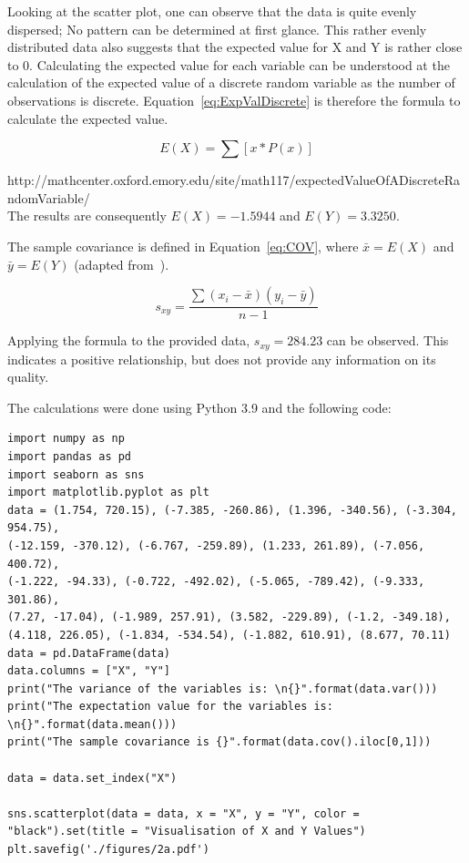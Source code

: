 Looking at the scatter plot, one can observe that the data is quite evenly dispersed; No pattern can be determined at first glance. This rather evenly distributed data also suggests that the expected value for X and Y is rather close to 0. Calculating the expected value for each variable can be understood at the calculation of the expected value of a discrete random variable as the number of observations is discrete. Equation~\ref{eq:ExpValDiscrete} is therefore the formula to calculate the expected value. 


\begin{equation}  E(X) = \sum [x * P(x)]
\label{eq:ExpValDiscrete}
\end{equation}

http://mathcenter.oxford.emory.edu/site/math117/expectedValueOfADiscreteRandomVariable/
\\

The results are consequently $E(X) = -1.5944$ and $E(Y) = 3.3250$.

The sample covariance is defined in Equation~\ref{eq:COV}, where $\bar{x} = E(X)$ and $\bar{y} = E(Y)$ (adapted from~\cite{bruce2017practical}).

\begin{equation}  s_{xy} = \frac{\sum(x_{i}-\bar{x})(y_{i}-\bar{y})}{n-1}
\label{eq:COV}
\end{equation}

Applying the formula to the provided data, $s_{xy} = 284.23$ can be observed. This indicates a positive relationship, but does not provide any information on its quality. 

The calculations were done using Python 3.9 and the following code:

\begin{lstlisting}
import numpy as np
import pandas as pd
import seaborn as sns
import matplotlib.pyplot as plt
data = (1.754, 720.15), (-7.385, -260.86), (1.396, -340.56), (-3.304, 954.75),
(-12.159, -370.12), (-6.767, -259.89), (1.233, 261.89), (-7.056, 400.72), 
(-1.222, -94.33), (-0.722, -492.02), (-5.065, -789.42), (-9.333, 301.86),
(7.27, -17.04), (-1.989, 257.91), (3.582, -229.89), (-1.2, -349.18), 
(4.118, 226.05), (-1.834, -534.54), (-1.882, 610.91), (8.677, 70.11)
data = pd.DataFrame(data)
data.columns = ["X", "Y"]
print("The variance of the variables is: \n{}".format(data.var()))
print("The expectation value for the variables is: \n{}".format(data.mean()))
print("The sample covariance is {}".format(data.cov().iloc[0,1]))

data = data.set_index("X")

sns.scatterplot(data = data, x = "X", y = "Y", color = "black").set(title = "Visualisation of X and Y Values")
plt.savefig('./figures/2a.pdf')
\end{lstlisting}


